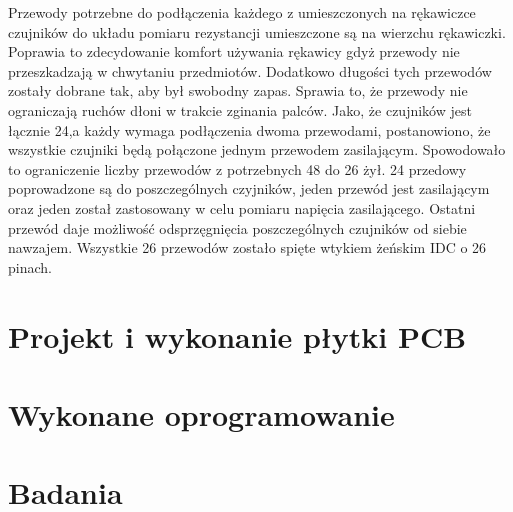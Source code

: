 \documentclass[10pt, a4paper]{article}
\begin{document}
Przewody potrzebne do podłączenia każdego z umieszczonych na rękawiczce czujników do układu pomiaru rezystancji umieszczone są na wierzchu rękawiczki. Poprawia to zdecydowanie komfort używania rękawicy gdyż przewody nie przeszkadzają w chwytaniu przedmiotów. Dodatkowo długości tych przewodów zostały dobrane tak, aby był swobodny zapas. Sprawia to, że przewody nie ograniczają ruchów dłoni w trakcie zginania palców. Jako, że czujników jest łącznie 24,a każdy wymaga podłączenia dwoma przewodami, postanowiono, że wszystkie czujniki będą połączone jednym przewodem zasilającym. Spowodowało to ograniczenie liczby przewodów z potrzebnych 48 do 26 żył. 24 przedowy poprowadzone są do poszczególnych czyjników, jeden przewód jest zasilającym oraz jeden został zastosowany w celu pomiaru napięcia zasilającego. Ostatni przewód daje możliwość odsprzęgnięcia poszczególnych czujników od siebie nawzajem. Wszystkie 26 przewodów zostało spięte wtykiem żeńskim IDC o 26 pinach.



\section{Projekt i wykonanie płytki PCB}
\label{sec:PCB}

\section{Wykonane oprogramowanie}
\label{sec:program}

\section{Badania}
\label{sec:badania}
\end{document}
